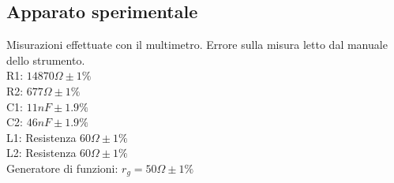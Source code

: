 
\subsection{Apparato sperimentale}
Misurazioni effettuate con il multimetro. Errore sulla misura letto dal manuale dello strumento.\\
%
R1: $14870\Omega \pm 1\%$\\ 
R2: $677\Omega \pm 1\%$\\
C1: $11nF \pm  1.9\%$\\
C2: $46nF \pm 1.9\%$\\
L1: Resistenza $ 60 \Omega \pm 1\%$\\
L2: Resistenza $ 60 \Omega \pm 1\%$\\
Generatore di funzioni: $r_g = 50\Omega \pm 1\%$\\

